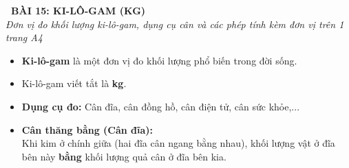 \documentclass[11pt,a4paper]{article}
\begin{document}
\begin{tcolorbox}[
  enhanced,
  colback=violet!8!white,
  colframe=violet!70!black,
  arc=3mm, boxrule=1.2pt,
  left=3mm, right=3mm, top=2mm, bottom=2mm,
  halign=center
]
  {\LARGE\bfseries\color{violet!90!black}\faBookmark\ BÀI 15: KI-LÔ-GAM (KG)}\\[1mm]
  {\itshape\footnotesize\color{black!75} Đơn vị đo khối lượng ki-lô-gam, dụng cụ cân và các phép tính kèm đơn vị trên 1 trang A4}
\end{tcolorbox}

\vspace{-2mm}

\noindent
\begin{minipage}[t]{0.49\textwidth}\vspace{0pt}
\begin{tcolorbox}[
  enhanced,
  colback=violet!4!white,
  colframe=violet!75!black,
  arc=2mm, boxrule=0.8pt,
  left=2mm, right=2mm, top=1.8mm, bottom=1.8mm,
  title={\footnotesize\bfseries\color{white}\faKey\ 1. Đơn vị đo ki-lô-gam}
]
{\footnotesize
\begin{itemize}\setlength{\itemsep}{1pt}\setlength{\leftskip}{-2.5mm}
  \item \textbf{Ki-lô-gam} là một đơn vị đo khối lượng phổ biến trong đời sống.
  \item Ki-lô-gam viết tắt là \textbf{kg}.
  \item \textbf{Dụng cụ đo:} Cân đĩa, cân đồng hồ, cân điện tử, cân sức khỏe,...
  \item \textbf{Cân thăng bằng (Cân đĩa):}\\
  Khi kim ở chính giữa (hai đĩa cân ngang bằng nhau), khối lượng vật ở đĩa bên này \textbf{bằng} khối lượng quả cân ở đĩa bên kia.
\end{itemize}
}
\end{tcolorbox}
\end{minipage}
\hfill
\end{document}
